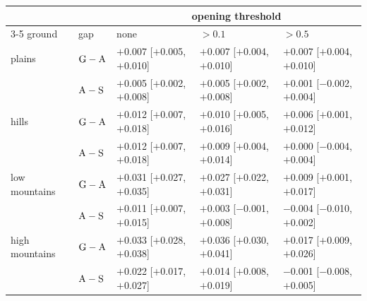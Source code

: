 \begin{tabular}{@{}l l l l l@{}}
\toprule
 & & \multicolumn{3}{c}{opening threshold} \\
\cmidrule(l){3-5}
 ground & gap & none & $>0.1$ & $>0.5$ \\
\midrule
plains & $\mathrm{G}-\mathrm{A}$ & $+$0.007 [$+$0.005, $+$0.010] & $+$0.007 [$+$0.004, $+$0.010] & $+$0.007 [$+$0.004, $+$0.010] \\
 & $\mathrm{A}-\mathrm{S}$ & $+$0.005 [$+$0.002, $+$0.008] & $+$0.005 [$+$0.002, $+$0.008] & $+$0.001 [$-$0.002, $+$0.004] \\
\addlinespace
hills & $\mathrm{G}-\mathrm{A}$ & $+$0.012 [$+$0.007, $+$0.018] & $+$0.010 [$+$0.005, $+$0.016] & $+$0.006 [$+$0.001, $+$0.012] \\
 & $\mathrm{A}-\mathrm{S}$ & $+$0.012 [$+$0.007, $+$0.018] & $+$0.009 [$+$0.004, $+$0.014] & $+$0.000 [$-$0.004, $+$0.004] \\
\addlinespace
low mountains & $\mathrm{G}-\mathrm{A}$ & $+$0.031 [$+$0.027, $+$0.035] & $+$0.027 [$+$0.022, $+$0.031] & $+$0.009 [$+$0.001, $+$0.017] \\
 & $\mathrm{A}-\mathrm{S}$ & $+$0.011 [$+$0.007, $+$0.015] & $+$0.003 [$-$0.001, $+$0.008] & $-$0.004 [$-$0.010, $+$0.002] \\
\addlinespace
high mountains & $\mathrm{G}-\mathrm{A}$ & $+$0.033 [$+$0.028, $+$0.038] & $+$0.036 [$+$0.030, $+$0.041] & $+$0.017 [$+$0.009, $+$0.026] \\
 & $\mathrm{A}-\mathrm{S}$ & $+$0.022 [$+$0.017, $+$0.027] & $+$0.014 [$+$0.008, $+$0.019] & $-$0.001 [$-$0.008, $+$0.005] \\
\bottomrule
\end{tabular}
